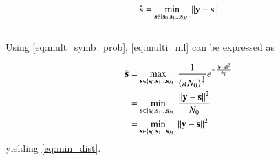 \documentclass[journal,12pt,twocolumn]{IEEEtran}
\renewcommand\thesection{\arabic{section}}
\begin{document}
\begin{enumerate}[label=\thesection.\arabic*.,ref=\thesection.\theenumi]
\begin{align}
\label{eq:min_dist}
\hat{\mathbf{s}} = \min_{\mathbf{s} \in \left\{\mathbf{s}_0,\mathbf{s}_1 \dots \mathbf{s}_M\right\}} \left\lVert\mathbf{y}-\mathbf{s}\right\rVert
\end{align}
\\
\solution Using \eqref{eq:mult_symb_prob},  \eqref{eq:multi_ml} can be expressed as

\begin{align}
\hat{\mathbf{s}} &= \max_{\mathbf{s} \in \left\{\mathbf{s}_0,\mathbf{s}_1 \dots \mathbf{s}_M\right\}}  \frac{1}{\left(\pi N_0\right)^{\frac{1}{2}}}e^{-\frac{\left\lVert\mathbf{y}-\mathbf{s}\right\rVert^2}{N_0}}
\\
&=\min_{\mathbf{s} \in \left\{\mathbf{s}_0,\mathbf{s}_1 \dots \mathbf{s}_M\right\}}\frac{\left\lVert\mathbf{y}-\mathbf{s}\right\rVert^2}{N_0}
\\
&=\min_{\mathbf{s} \in \left\{\mathbf{s}_0,\mathbf{s}_1 \dots \mathbf{s}_M\right\}}\left\lVert\mathbf{y}-\mathbf{s}\right\rVert^2
\end{align}
yielding \eqref{eq:min_dist}.


\end{enumerate}
\end{document}
